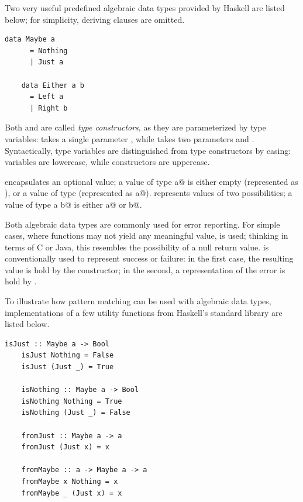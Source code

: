 \documentclass[UdineBachThesis,american,11pt]{PhdThesis}
\begin{document}
  Two very useful predefined algebraic data types provided by Haskell are listed
  below; for simplicity, deriving clauses are omitted.

  \begin{lstlisting}[gobble=4,basicstyle=\ttfamily\small]
    data Maybe a
      = Nothing
      | Just a

    data Either a b
      = Left a
      | Right b
  \end{lstlisting}

  Both \lstinline@Maybe@ and \lstinline@Either@ are called \emph{type
  constructors}, as they are parameterized by type variables: \lstinline@Maybe@
  takes a single parameter \lstinline@a@, while \lstinline@Either@ takes two
  parameters \lstinline@a@ and \lstinline@b@. Syntactically, type variables are
  distinguished from type constructors by casing: variables are lowercase, while
  constructors are uppercase.

  \lstinline@Maybe@ encapsulates an optional value; a value of type
  \lstinline@Maybe a@ is either empty (represented as \lstinline@Nothing@), or a
  value of type \lstinline@a@ (represented as \lstinline@Just a@).
  \lstinline@Either@ represents values of two possibilities; a value of type
  \lstinline@Either a b@ is either \lstinline@Left a@ or \lstinline@Right b@.

  \pagebreak

  Both algebraic data types are commonly used for error reporting. For simple
  cases, where functions may not yield any meaningful value, \lstinline@Maybe@
  is used; thinking in terms of C or Java, this resembles the possibility of a
  null return value. \lstinline@Either@ is conventionally used to represent
  success or failure: in the first case, the resulting value is hold by the
  \lstinline@Right@ constructor; in the second, a representation of the error is
  hold by \lstinline@Left@.

  To illustrate how pattern matching can be used with algebraic data types,
  implementations of a few utility functions from Haskell's standard library
  are listed below.

  \begin{lstlisting}[gobble=4,basicstyle=\ttfamily\small]
    isJust :: Maybe a -> Bool
    isJust Nothing = False
    isJust (Just _) = True

    isNothing :: Maybe a -> Bool
    isNothing Nothing = True
    isNothing (Just _) = False

    fromJust :: Maybe a -> a
    fromJust (Just x) = x

    fromMaybe :: a -> Maybe a -> a
    fromMaybe x Nothing = x
    fromMaybe _ (Just x) = x
  \end{lstlisting}
\end{document}
